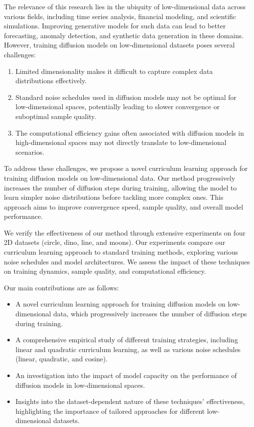 \documentclass{article} %
\begin{document}
The relevance of this research lies in the ubiquity of low-dimensional data across various fields, including time series analysis, financial modeling, and scientific simulations. Improving generative models for such data can lead to better forecasting, anomaly detection, and synthetic data generation in these domains. However, training diffusion models on low-dimensional datasets poses several challenges:

\begin{enumerate}
    \item Limited dimensionality makes it difficult to capture complex data distributions effectively.
    \item Standard noise schedules used in diffusion models may not be optimal for low-dimensional spaces, potentially leading to slower convergence or suboptimal sample quality.
    \item The computational efficiency gains often associated with diffusion models in high-dimensional spaces may not directly translate to low-dimensional scenarios.
\end{enumerate}

To address these challenges, we propose a novel curriculum learning approach for training diffusion models on low-dimensional data. Our method progressively increases the number of diffusion steps during training, allowing the model to learn simpler noise distributions before tackling more complex ones. This approach aims to improve convergence speed, sample quality, and overall model performance.

We verify the effectiveness of our method through extensive experiments on four 2D datasets (circle, dino, line, and moons). Our experiments compare our curriculum learning approach to standard training methods, exploring various noise schedules and model architectures. We assess the impact of these techniques on training dynamics, sample quality, and computational efficiency.

Our main contributions are as follows:
\begin{itemize}
    \item A novel curriculum learning approach for training diffusion models on low-dimensional data, which progressively increases the number of diffusion steps during training.
    \item A comprehensive empirical study of different training strategies, including linear and quadratic curriculum learning, as well as various noise schedules (linear, quadratic, and cosine).
    \item An investigation into the impact of model capacity on the performance of diffusion models in low-dimensional spaces.
    \item Insights into the dataset-dependent nature of these techniques' effectiveness, highlighting the importance of tailored approaches for different low-dimensional datasets.
\end{itemize}
\end{document}
